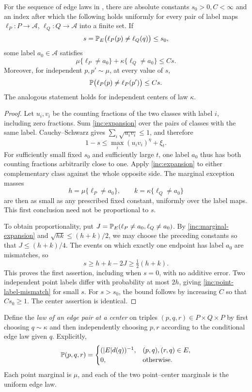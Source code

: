 \begin{lemma}\label{inc:matching}
For the sequence of edge laws in , there are absolute
constants \(s_0>0,C<\infty\) and an index after which the following
holds uniformly for every pair of label maps
\(\ell_P:P\to\mathcal A\), \(\ell_Q:Q\to\mathcal A\) into a
finite set. If
\[
 s=\mathbb P_E\bigl(\ell_P(p)\ne\ell_Q(q)\bigr)\le s_0,
\]
some label \(a_0\in\mathcal A\) satisfies
\[
 \mu\{\ell_P\ne a_0\}+\kappa\{\ell_Q\ne a_0\}\le Cs.
\]
Moreover, for independent \(p,p'\sim\mu\), at every value of \(s\),
\begin{equation}\label{inc:point-label-mismatch}
 \mathbb P\bigl(\ell_P(p)\ne\ell_P(p')\bigr)\le Cs.
\end{equation}
The analogous statement holds for independent centers of law \(\kappa\).
\end{lemma}

\begin{proof}
Let \(u_i,v_i\) be the counting fractions of the two classes with label
\(i\), including zero fractions. Sum \eqref{inc:expansion} over the
pairs of classes with the same label. Cauchy--Schwarz gives
\(\sum_i\sqrt{u_iv_i}\le1\), and therefore
\[
 1-s\le\max_i(u_iv_i)^\eta+\xi_t.
\]
For sufficiently small fixed \(s_0\) and sufficiently large \(t\),
one label \(a_0\) thus has both counting fractions arbitrarily close
to one. Apply \eqref{inc:expansion} to either complementary class
against the whole opposite side. The marginal exception masses
\[
 h=\mu\{\ell_P\ne a_0\},\qquad
 k=\kappa\{\ell_Q\ne a_0\}
\]
are then as small as any prescribed fixed constant, uniformly over
the label maps. This first conclusion need not be proportional to \(s\).

To obtain proportionality, put
\(J=\mathbb P_E(\ell_P\ne a_0,\ell_Q\ne a_0)\).
By \eqref{inc:marginal-expansion} and \(\sqrt{hk}\le(h+k)/2\),
we may choose the preceding constants so that
\(J\le(h+k)/4\). The events on which exactly one endpoint has label
\(a_0\) are mismatches, so
\[
 s\ge h+k-2J\ge\tfrac12(h+k).
\]
This proves the first assertion, including when \(s=0\), with no
additive error. Two independent point labels differ with probability
at most \(2h\), giving \eqref{inc:point-label-mismatch} for small
\(s\). For \(s>s_0\), the bound follows by increasing \(C\) so
that \(Cs_0\ge1\). The center assertion is identical.
\end{proof}

Define the \emph{law of an edge pair at a center} on triples \((p,q,r)\in P\times Q\times P\)
by first choosing \(q\sim\kappa\) and then independently choosing
\(p,r\) according to the conditional edge law given \(q\). Explicitly,
\begin{equation}\label{inc:wedge-law}
 \mathbb P(p,q,r)=
 \begin{cases}
 (|E|d(q))^{-1},&(p,q),(r,q)\in E,\\
 0,&\text{otherwise}.
 \end{cases}
\end{equation}
Each point marginal is \(\mu\), and each of the two point--center
marginals is the uniform edge law.

